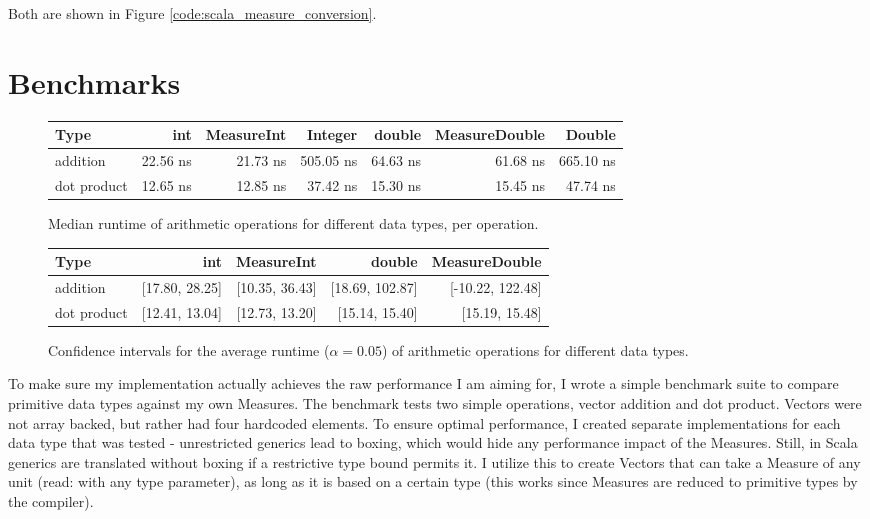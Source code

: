 \documentclass[12pt,oneside,a4paper]{scrbook}
\begin{document}
Both are shown in Figure \ref{code:scala_measure_conversion}.



\chapter{Benchmarks}
\label{cha:bench}

\begin{figure}
\begin{tabular}{lrrrrrr}
Type          & int      & MeasureInt  &    Integer  & double   & MeasureDouble  & Double \\
\midrule
addition      & 22.56 ns &  21.73 ns   &  505.05 ns  & 64.63 ns &  61.68 ns      & 665.10 ns \\
dot product   & 12.65 ns &  12.85 ns   &   37.42 ns  & 15.30 ns &  15.45 ns      &  47.74 ns
\end{tabular}
\caption{Median runtime of arithmetic operations for different data types, per operation.}
\label{bench:scala_measures_median}
\end{figure}

\begin{figure}
\begin{tabular}{lrrrr}
Type          & int             & MeasureInt      &     double      & MeasureDouble  \\
\midrule
addition      & [17.80, 28.25]  & [10.35, 36.43]  & [18.69, 102.87] & [-10.22, 122.48] \\
dot product   & [12.41, 13.04]  & [12.73, 13.20]  &  [15.14, 15.40] &  [15.19, 15.48]
\end{tabular}
\caption{Confidence intervals for the average runtime ($\alpha = 0.05$) of arithmetic operations for different data types.}
\label{bench:scala_measures_interval}
\end{figure}


To make sure my implementation actually achieves the raw performance I am aiming for, I wrote a simple benchmark suite to compare primitive data types against my own Measures. The benchmark tests two simple operations, vector addition and dot product. Vectors were not array backed, but rather had four hardcoded elements. To ensure optimal performance, I created separate implementations for each data type that was tested - unrestricted generics lead to boxing, which would hide any performance impact of the Measures. Still, in Scala generics are translated without boxing if a restrictive type bound permits it. I utilize this to create Vectors that can take a Measure of any unit (read: with any type parameter), as long as it is based on a certain type (this works since Measures are reduced to primitive types by the compiler).
\end{document}
